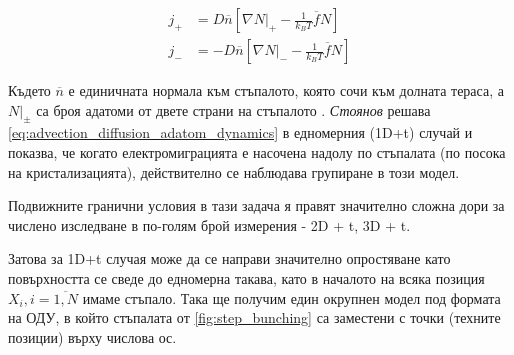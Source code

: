 \begin{align*}
	j_+  &= D \overline{n} \left[ \nabla N|_+ - \frac{1}{k_B T} \overline{f} N \right] \\
	j_-  &= - D \overline{n} \left[ \nabla N|_- - \frac{1}{k_B T} \overline{f} N \right] 
\end{align*}

Където $\overline{n}$ е единичната нормала към стъпалото, която сочи към долната тераса, а  $N|_\pm$ са броя адатоми от двете страни на стъпалото \cite{Krug2005}.
\textit{Стоянов} \cite{StoyanStoyanov1991} решава \autoref{eq:advection_diffusion_adatom_dynamics} в едномерния (1D+t) случай и показва, че когато електромиграцията е насочена надолу по стъпалата (по посока на кристализацията), действително се наблюдава групиране в този модел. 

Подвижните гранични условия в тази задача я правят значително сложна дори за числено изследване в по-голям брой измерения - 2D + t, 3D + t. 

Затова за 1D+t случая може да се направи значително опростяване като повърхността се сведе до едномерна такава, като в началото на всяка позиция $X_i, i = \overline{1,N}$ имаме стъпало. Така ще получим един окрупнен модел под формата на ОДУ, в който стъпалата от \autoref{fig:step_bunching} са заместени с точки (техните позиции) върху числова ос.

